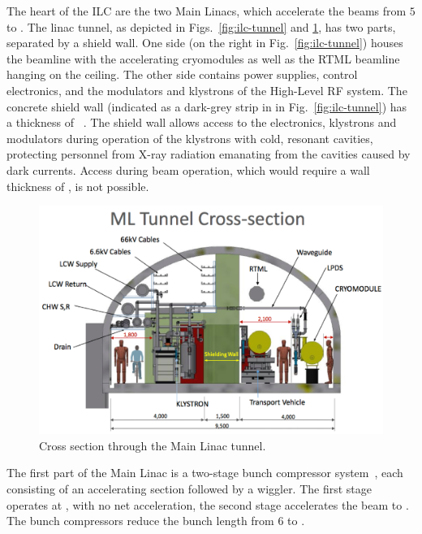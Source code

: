 The heart of the ILC are the two Main Linacs, which accelerate the beams from $5$ to .
The linac tunnel, as depicted in Figs.~\ref{fig:ilc-tunnel} and \ref{fig:ml-tunnel}, has two parts, separated by a shield wall. 
One side (on the right in Fig.~\ref{fig:ilc-tunnel}) houses the beamline with the accelerating cryomodules as well as the RTML beamline hanging on the ceiling.
The other side contains power supplies, control electronics, and the modulators and klystrons of the High-Level RF system.
The concrete shield wall (indicated as a dark-grey strip in in Fig.~\ref{fig:ilc-tunnel}) has a thickness of ~\cite{bib:cr-0012}.
The shield wall allows access to the electronics, klystrons and modulators during operation of the klystrons with cold, resonant cavities, protecting personnel from X-ray radiation emanating from the cavities caused by dark currents.
Access during beam operation, which would require a wall thickness of , is not possible.

\begin{figure}[htbp]
   \includegraphics[width=\hsize]{chapters/figures/ML-cross-section}
\caption{Cross section through the Main Linac tunnel.}
\label{fig:ml-tunnel}
\end{figure}

The first part of the Main Linac is a two-stage bunch compressor system~\cite[Sec. 7.3.3.5]{Adolphsen:2013kya}, each consisting of an accelerating section followed by a wiggler. 
The first stage operates at , with no net acceleration, the second stage accelerates the beam to .
The bunch compressors reduce the bunch length from $6$ to .

